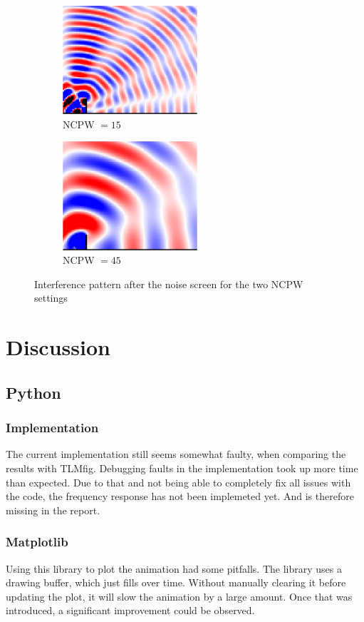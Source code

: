 \documentclass[twocolumn]{article}
\begin{document}
\begin{figure}[H]
    \begin{subfigure}[]{75mm}
        \centering
        \includegraphics[width=50mm]{./Images/3_3_ncpw_15.png}
        \caption{NCPW $= 15$}
    \end{subfigure}
    \begin{subfigure}[]{75mm}
        \centering
        \includegraphics[width=50mm]{./Images/3_3_ncpw_45.png}
        \caption{NCPW $= 45$}
    \end{subfigure}
    \caption{Interference pattern after the noise screen for the two NCPW settings}
    \label{fig_3_3_interference}
\end{figure}

\section{Discussion}

\subsection{Python}
\subsubsection{Implementation}
The current implementation still seems somewhat faulty, when comparing the results
with TLMfig.
Debugging faults in the implementation took up more time than expected.
Due to that and not being able to completely fix all issues with the code, the frequency
response has not been implemeted yet.
And is therefore missing in the report.

\subsubsection{Matplotlib}
Using this library to plot the animation had some pitfalls.
The library uses a drawing buffer, which just fills over time.
Without manually clearing it before updating the plot, it will slow
the animation by a large amount.
Once that was introduced, a significant improvement could be observed.
\end{document}
